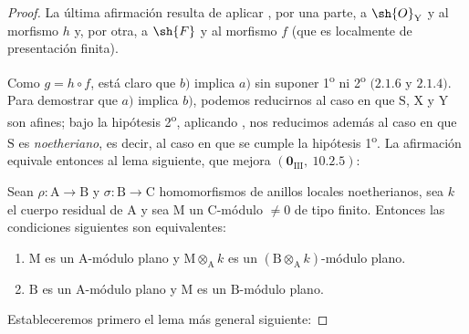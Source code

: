 \begin{proof}
La última afirmación resulta de aplicar , por una parte, a $\sh{O}_\mathrm{Y}$ y al morfismo $h$ y, por otra, a $\sh{F}$ y al morfismo $f$ (que es localmente de presentación finita).

Como $g=h\circ f$, está claro que $b)$ implica $a)$ sin suponer 1\textsuperscript{o} ni 2\textsuperscript{o} $(2.1.6$ y $2.1.4)$. Para demostrar que $a)$ implica $b)$, podemos reducirnos al caso en que $\mathrm{S}$, $\mathrm{X}$ y $\mathrm{Y}$ son afines; bajo la hipótesis 2\textsuperscript{o}, aplicando , nos reducimos además al caso en que $\mathrm{S}$ es \emph{noetheriano}, es decir, al caso en que se cumple la hipótesis 1\textsuperscript{o}. La afirmación equivale entonces al lema siguiente, que mejora $(\mathbf{0}_{\mathrm{III}},~10.2.5)$:

\begin{lemma}[11.3.10.1]
\label{IV.11.3.10.1}
Sean $\rho:\mathrm{A}\to\mathrm{B}$ y $\sigma:\mathrm{B}\to\mathrm{C}$ homomorfismos de anillos locales noetherianos, sea $k$ el cuerpo residual de $\mathrm{A}$ y sea $\mathrm{M}$ un $\mathrm{C}$-módulo $\neq 0$ de tipo finito. Entonces las condiciones siguientes son equivalentes:
\begin{enumerate}[label=\emph{\alph*)}]
  \item $\mathrm{M}$ es un $\mathrm{A}$-módulo plano y $\mathrm{M}\otimes_\mathrm{A} k$ es un $(\mathrm{B}\otimes_\mathrm{A} k)$-módulo plano.
  \item $\mathrm{B}$ es un $\mathrm{A}$-módulo plano y $\mathrm{M}$ es un $\mathrm{B}$-módulo plano.
\end{enumerate}
\end{lemma}

Estableceremos primero el lema más general siguiente:


\end{proof}
